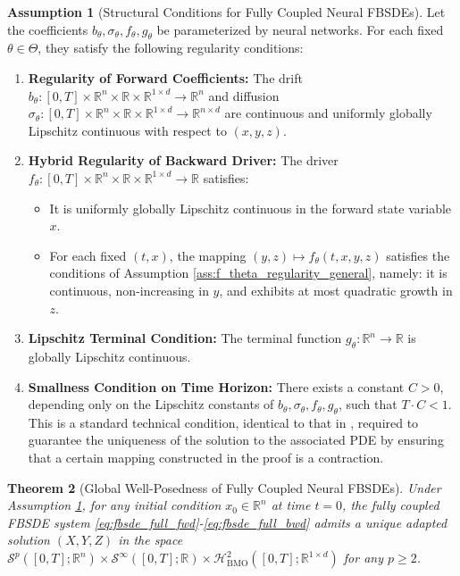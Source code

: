 \documentclass[qian]{imsart}
\newcommand{\R}{\mathbb{R}}
\theoremstyle{plain}
\newtheorem{theorem}{Theorem}[section]
\theoremstyle{definition}
\newtheorem{assumption}[theorem]{Assumption}
\begin{document}
\begin{assumption}[Structural Conditions for Fully Coupled Neural FBSDEs]
\label{ass:fbsde_structure}
Let the coefficients $b_\theta, \sigma_\theta, f_\theta, g_\theta$ be parameterized by neural networks. For each fixed $\theta \in \Theta$, they satisfy the following regularity conditions:
\begin{enumerate}[label=(\roman*)]
    \item \textbf{Regularity of Forward Coefficients:} The drift $b_\theta: [0,T] \times \R^n \times \R \times \R^{1\times d} \to \R^n$ and diffusion $\sigma_\theta: [0,T] \times \R^n \times \R \times \R^{1\times d} \to \R^{n \times d}$ are continuous and uniformly globally Lipschitz continuous with respect to $(x,y,z)$.

    \item \textbf{Hybrid Regularity of Backward Driver:} The driver $f_\theta: [0,T] \times \R^n \times \R \times \R^{1 \times d} \to \R$ satisfies:
    \begin{itemize}
        \item It is uniformly globally Lipschitz continuous in the forward state variable $x$.
        \item For each fixed $(t,x)$, the mapping $(y,z) \mapsto f_\theta(t,x,y,z)$ satisfies the conditions of Assumption \ref{ass:f_theta_regularity_general}, namely: it is continuous, non-increasing in $y$, and exhibits at most quadratic growth in $z$.
    \end{itemize}

    \item \textbf{Lipschitz Terminal Condition:} The terminal function $g_\theta: \R^n \to \R$ is globally Lipschitz continuous.

    \item \textbf{Smallness Condition on Time Horizon:} There exists a constant $C > 0$, depending only on the Lipschitz constants of $b_\theta, \sigma_\theta, f_\theta, g_\theta$, such that $T \cdot C < 1$. This is a standard technical condition, identical to that in \cite{Delarue2002}, required to guarantee the uniqueness of the solution to the associated PDE by ensuring that a certain mapping constructed in the proof is a contraction.
\end{enumerate}
\end{assumption}

\begin{theorem}[Global Well-Posedness of Fully Coupled Neural FBSDEs]
\label{thm:fbsde_wellposedness}
Under Assumption \ref{ass:fbsde_structure}, for any initial condition $x_0 \in \R^n$ at time $t=0$, the fully coupled FBSDE system \eqref{eq:fbsde_full_fwd}-\eqref{eq:fbsde_full_bwd} admits a unique adapted solution $(X, Y, Z)$ in the space $\mathcal{S}^p([0,T]; \R^n) \times \mathcal{S}^\infty([0,T]; \R) \times \mathcal{H}^2_{\mathrm{BMO}}([0,T]; \R^{1 \times d})$ for any $p \ge 2$.
\end{theorem}
\end{document}
